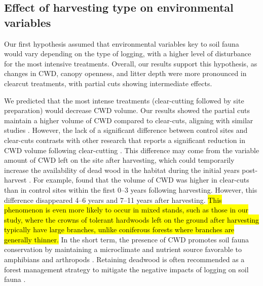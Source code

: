 \subsection*{Effect of harvesting type on environmental variables}
\label{disc:env_var}

Our first hypothesis assumed that environmental variables key to soil fauna would vary depending on the type of logging, with a higher level of disturbance for the most intensive treatments. 
Overall, our results support this hypothesis, as changes in CWD, canopy openness, and litter depth were more pronounced in clearcut treatments, with partial cuts showing intermediate effects. 

We predicted that the most intense treatments (clear-cutting followed by site preparation) would decrease CWD volume. 
Our results showed the partial cuts maintain a higher volume of CWD compared to clear-cuts, aligning with similar studies \citep{Nolet2018Comparingeffects,Ochs2022Responseterrestrial}. 
However, the lack of a significant difference between control sites and clear-cuts contrasts with other research that reports a significant reduction in CWD volume following clear-cutting \citep{Farnell2020effectsvariable}. 
This difference may come from the variable amount of CWD left on the site after harvesting, which could temporarily increase the availability of dead wood in the habitat during the initial years post-harvest \citep{McCarthy1994Distributionabundance,Etcheverry2005Responsesmall}. 
For example, \cite{Ochs2022Responseterrestrial} found that the volume of CWD was higher in clear-cuts than in control sites within the first 0–3 years following harvesting. 
However, this difference disappeared 4–6 years and 7–11 years after harvesting. 
\hl{This phenomenon is even more likely to occur in mixed stands, such as those in our study, where the crowns of tolerant hardwoods left on the ground after harvesting typically have large branches, unlike coniferous forests where branches are generally thinner. }
In the short term, the presence of CWD promotes soil fauna conservation by maintaining a microclimate and nutrient source favorable to amphibians and arthropods \citep{spotilaRoleTemperatureWater1972,Huhta1976Effectsclearcutting,Seibold2021contributioninsects,Ochs2022Responseterrestrial}. 
Retaining deadwood is often recommended as a forest management strategy to mitigate the negative impacts of logging on soil fauna \citep{McKenny2006Effectsstructural,Raymond-Leonard2020Deadwood}. 
